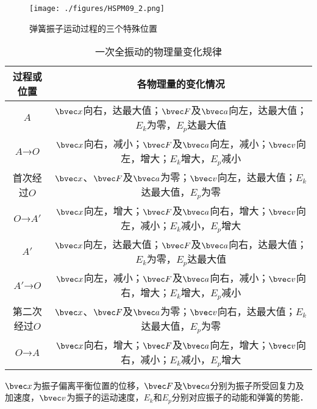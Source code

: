 \begin{figure}[ht]
\centering
\texttt{[image: ./figures/HSPM09\_2.png]}
\caption{弹簧振子运动过程的三个特殊位置} \label{HSPM09_fig2}
\end{figure}

\begin{table}[ht]
\centering
\caption{一次全振动的物理量变化规律}\label{HSPM09_tab1}
\begin{tabular}{|c|c|}
\hline
过程或位置 & 各物理量的变化情况 \\
\hline
$A$ & $\bvec x$向右，达最大值；$\bvec F$及$\bvec a$向左，达最大值；$E_k$为零，$E_p$达最大值 \\
\hline
$A$→$O$ & $\bvec x$向右，减小；$\bvec F$及$\bvec a$向左，减小；$\bvec v$向左，增大；$E_k$增大，$E_p$减小 \\
\hline
首次经过$O$ & $\bvec x$、$\bvec F$及$\bvec a$为零；$\bvec v$向左，达最大值；$E_k$达最大值，$E_p$为零 \\
\hline
$O$→$A'$ & $\bvec x$向左，增大；$\bvec F$及$\bvec a$向右，增大；$\bvec v$向左，减小；$E_k$减小，$E_p$增大 \\
\hline
$A'$ & $\bvec x$向左，达最大值；$\bvec F$及$\bvec a$向右，达最大值；$E_k$为零，$E_p$达最大值 \\
\hline
$A'$→$O$ & $\bvec x$向左，减小；$\bvec F$及$\bvec a$向右，减小；$\bvec v$向右，增大；$E_k$增大，$E_p$减小 \\
\hline
第二次经过$O$ & $\bvec x$、$\bvec F$及$\bvec a$为零；$\bvec v$向右，达最大值；$E_k$达最大值，$E_p$为零 \\
\hline
$O$→$A$ & $\bvec x$向右，增大；$\bvec F$及$\bvec a$向左，增大；$\bvec v$向右，减小；$E_k$减小，$E_p$增大 \\
\hline
\end{tabular}
\end{table}
$\bvec x$为振子偏离平衡位置的位移，$\bvec F$及$\bvec a$分别为振子所受回复力及加速度，$\bvec v$为振子的运动速度，$E_k$和$E_p$分别对应振子的动能和弹簧的势能．